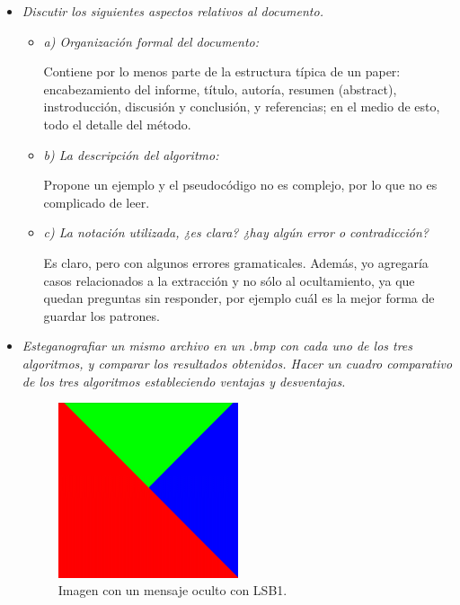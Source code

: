 \documentclass[a4paper,12pt]{article}
\def\FIG#1#2{%
	{\centering#1\par}
	#2}
\begin{document}
	\begin{itemize}
		\item \textit{Discutir los siguientes aspectos relativos al documento.}
		\begin{itemize}
			\item \textit{a) Organización formal del documento:}
			
			Contiene por lo menos parte de la estructura típica de un paper: encabezamiento del informe, título, autoría, resumen (abstract), instroducción, discusión y conclusión, y referencias; en el medio de esto, todo el detalle del método. 
			
			\item \textit{b) La descripción del algoritmo:}
			
			Propone un ejemplo y el pseudocódigo no es complejo, por lo que no es complicado de leer.

			
			\item \textit{c) La notación utilizada, ¿es clara? ¿hay algún error o contradicción?}
			
			Es claro, pero con algunos errores gramaticales. Además, yo agregaría casos relacionados a la extracción y no sólo al ocultamiento, ya que quedan preguntas sin responder, por ejemplo cuál es la mejor forma de guardar los patrones. 

		\end{itemize}
		
		\item \textit{Esteganografiar un mismo archivo en un .bmp con cada uno de los tres algoritmos, y comparar los resultados obtenidos. Hacer un cuadro comparativo de los tres algoritmos estableciendo ventajas y desventajas.}
			
		\begin{figure}[h!]%
			\FIG{\includegraphics[width=0.5\textwidth]{tricolor_lsb1.png}}
			{\caption{Imagen con un mensaje oculto con LSB1.}
				\label{fig1}}
		\end{figure}
	

\end{itemize}
\end{document}
